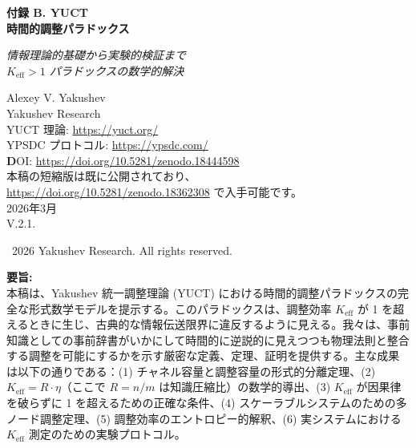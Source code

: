 \documentclass[12pt,a4paper]{ltjsarticle}
\begin{document}
	
	\begin{titlepage}
		\begin{center}
			\vspace*{0cm}
			\Huge\textbf{付録 B. YUCT\\
				時間的調整パラドックス}
			
			\vspace{0cm}
			\LARGE\textit{情報理論的基礎から実験的検証まで \\[0.3cm]
				$K_{\text{eff}} > 1$ パラドックスの数学的解決}
			
			\vspace{1cm}
			\Large
			Alexey V. Yakushev\\
			Yakushev Research\\
			YUCT 理論: \url{https://yuct.org/}\\
			YPSDC プロトコル: \url{https://ypsdc.com/}\\
			
			\vspace{2cm}
			\textbf DOI: \url{https://doi.org/10.5281/zenodo.18444598}\\
			
			\vspace{1cm}
			\large 
			本稿の短縮版は既に公開されており、\\ \url{https://doi.org/10.5281/zenodo.18362308} で入手可能です。\\
			\vspace{1cm}
			2026年3月 \\ \large V.2.1.
			
			\vspace{5cm}
			\textcopyright~2026 Yakushev Research. All rights reserved.
			
			\newpage
			\vfill
			\normalsize
			\begin{minipage}{0.8\textwidth}
				\centering
				\textbf{要旨:} \\ 本稿は、Yakushev 統一調整理論 (YUCT) における時間的調整パラドックスの完全な形式数学モデルを提示する。このパラドックスは、調整効率 $K_{\text{eff}}$ が 1 を超えるときに生じ、古典的な情報伝送限界に違反するように見える。我々は、事前知識としての事前辞書がいかにして時間的に逆説的に見えつつも物理法則と整合する調整を可能にするかを示す厳密な定義、定理、証明を提供する。主な成果は以下の通りである：(1) チャネル容量と調整容量の形式的分離定理、(2) $K_{\text{eff}} = R \cdot \eta$（ここで $R = n/m$ は知識圧縮比）の数学的導出、(3) $K_{\text{eff}}$ が因果律を破らずに 1 を超えるための正確な条件、(4) スケーラブルシステムのための多ノード調整定理、(5) 調整効率のエントロピー的解釈、(6) 実システムにおける $K_{\text{eff}}$ 測定のための実験プロトコル。
			\end{minipage}
			

\end{center}
\end{titlepage}
\end{document}

